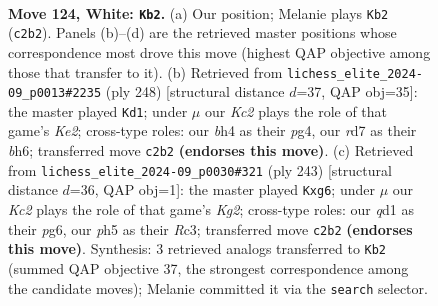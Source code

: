 \documentclass[11pt]{article}
\begin{document}
\begin{figure}[p]\centering
\begin{subfigure}{0.46\textwidth}\centering
\resizebox{\linewidth}{!}{%
\newchessgame
\chessboard[
  setfen={1R6/3r3n/8/4p2p/7b/8/2K3k1/3q4 w - - 0 124},
  showmover=false,
  pgfstyle=straightmove, color=movearrow, markmove={c2-b2}
]}
\caption{}
\end{subfigure}\hfill
\begin{subfigure}{0.46\textwidth}\centering
\resizebox{\linewidth}{!}{%
\newchessgame
\chessboard[
  setfen={8/8/7b/pp6/2k3p1/8/4K1q1/8 w - - 2 125},
  showmover=false,
  pgfstyle=straightmove, color=movearrow, markmove={e2-d1}
]}
\caption{}
\end{subfigure}
\\[4pt]
\begin{subfigure}{0.46\textwidth}\centering
\resizebox{\linewidth}{!}{%
\newchessgame
\chessboard[
  setfen={1R6/6k1/6P1/3B4/8/2r1p2P/8/3R2K1 b - - 0 122},
  showmover=false,
  pgfstyle=straightmove, color=movearrow, markmove={g7-g6}
]}
\caption{}
\end{subfigure}\hfill

\caption{\textbf{Move 124, White: \texttt{Kb2}.} (a) Our position; Melanie plays \texttt{Kb2} (\texttt{c2b2}). Panels (b)--(d) are the retrieved master positions whose correspondence most drove this move (highest QAP objective among those that transfer to it). (b) Retrieved from \texttt{lichess\_elite\_2024-09\_p0013\#2235} (ply 248) [structural distance $d$=37, QAP obj=35]: the master played \texttt{Kd1}; under $\mu$ our \emph{Kc2} plays the role of that game's \emph{Ke2}; cross-type roles: our \emph{b}h4 as their \emph{p}g4, our \emph{r}d7 as their \emph{b}h6; transferred move \texttt{c2b2} \textbf{(endorses this move)}. (c) Retrieved from \texttt{lichess\_elite\_2024-09\_p0030\#321} (ply 243) [structural distance $d$=36, QAP obj=1]: the master played \texttt{Kxg6}; under $\mu$ our \emph{Kc2} plays the role of that game's \emph{Kg2}; cross-type roles: our \emph{q}d1 as their \emph{p}g6, our \emph{p}h5 as their \emph{R}c3; transferred move \texttt{c2b2} \textbf{(endorses this move)}. Synthesis: 3 retrieved analogs transferred to \texttt{Kb2} (summed QAP objective 37, the strongest correspondence among the candidate moves); Melanie committed it via the \texttt{search} selector.}
\label{fig:thought-m246}
\end{figure}

\clearpage
\end{document}

